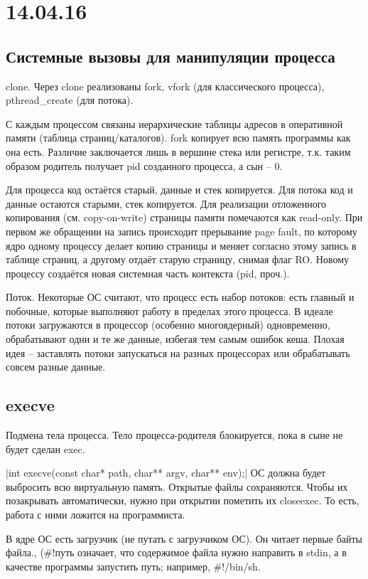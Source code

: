 \documentclass[a4paper,10pt]{article}
\begin{document}
\section{14.04.16}
\subsection{Системные вызовы для манипуляции процесса}
clone. Через clone реализованы fork, vfork (для классического процесса), pthread\_create (для потока).

С каждым процессом связаны иерархические таблицы адресов в оперативной памяти (таблица страниц/каталогов). fork копирует всю память программы как она есть. Различие заключается лишь в вершине стека или регистре, т.к. таким образом родитель получает pid созданного процесса, а сын -- 0. 

Для процесса код остаётся старый, данные и стек копируется. Для потока код и данные остаются старыми, стек копируется. Для реализации отложенного копирования (см. copy-on-write) страницы памяти помечаются как read-only. При первом же обращении на запись происходит прерывание page fault, по которому ядро одному процессу делает копию страницы и меняет согласно этому запись в таблице страниц, а другому отдаёт старую страницу, снимая флаг RO. Новому процессу создаётся новая системная часть контекста (pid, проч.).

Поток.
Некоторые ОС считают, что процесс есть набор потоков: есть главный и побочные, которые выполняют работу в пределах этого процесса. В идеале потоки загружаются в процессор (особенно многоядерный) одновременно, обрабатывают одни и те же данные, избегая тем самым ошибок кеша. Плохая идея -- заставлять потоки запускаться на разных процессорах или обрабатывать совсем разные данные.

\subsection{execve}
Подмена тела процесса. Тело процесса-родителя блокируется, пока в сыне не будет сделан exec. 

|int execve(const char* path, char** argv, char** env);|
ОС должна будет выбросить всю виртуальную память.
Открытые файлы сохраняются. Чтобы их позакрывать автоматически, нужно при открытии пометить их closeexec. То есть, работа с ними ложится на программиста.

В ядре ОС есть загрузчик (не путать с загрузчиком ОС). Он читает первые байты файла.,
(\#!путь означает, что содержимое файла нужно направить в stdin, а в качестве программы запустить путь; например, \#!/bin/sh.
\end{document}

